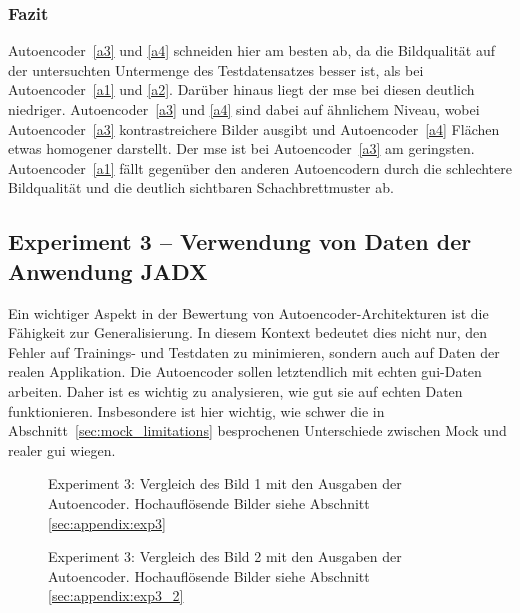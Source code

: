 \subsubsection*{Fazit}
Autoencoder~\ref{a3} und \ref{a4} schneiden hier am besten ab, da die Bildqualität auf der untersuchten Untermenge des Testdatensatzes besser ist, als bei Autoencoder~\ref{a1} und \ref{a2}. Darüber hinaus liegt der \gls{mse} bei diesen deutlich niedriger. Autoencoder~\ref{a3} und \ref{a4} sind dabei auf ähnlichem Niveau, wobei Autoencoder~\ref{a3} kontrastreichere Bilder ausgibt und Autoencoder~\ref{a4} Flächen etwas homogener darstellt. Der \gls{mse} ist bei Autoencoder~\ref{a3} am geringsten. Autoencoder~\ref{a1} fällt gegenüber den anderen Autoencodern durch die schlechtere Bildqualität und die deutlich sichtbaren Schachbrettmuster ab.

\subsection{Experiment 3 -- Verwendung von Daten der Anwendung JADX}
\label{subsec:exp3}
Ein wichtiger Aspekt in der Bewertung von Autoencoder-Architekturen ist die Fähigkeit zur Generalisierung. In diesem Kontext bedeutet dies nicht nur, den Fehler auf Trainings- und Testdaten zu minimieren, sondern auch auf Daten der realen Applikation. Die Autoencoder sollen letztendlich mit echten \gls{gui}-Daten arbeiten. Daher ist es wichtig zu analysieren, wie gut sie auf echten Daten funktionieren. Insbesondere ist hier wichtig, wie schwer die in Abschnitt~\ref{sec:mock_limitations} besprochenen Unterschiede zwischen Mock und realer \gls{gui} wiegen.

\begin{figure}[htbp]
    \centering
    \resizebox*{!}{.98\textheight}{}
    \caption{Experiment 3: Vergleich des Bild 1 mit den Ausgaben der Autoencoder. Hochauflösende Bilder siehe Abschnitt \ref{sec:appendix:exp3}}
    \label{exp3_image:1}
\end{figure}

\begin{figure}[htbp]
    \centering
    \resizebox*{!}{.98\textheight}{}
    \caption{Experiment 3: Vergleich des Bild 2 mit den Ausgaben der Autoencoder. Hochauflösende Bilder siehe Abschnitt \ref{sec:appendix:exp3_2}}
    \label{exp3_image:2}
\end{figure}


